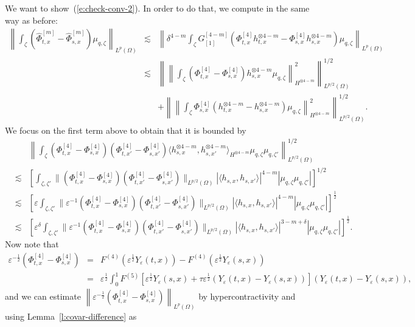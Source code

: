 We want to show~(\ref{e:check-conv-2}). In order to do that, we compute in the
same way as before:
\begin{eqnarray*}
  \left\| \int_{\zeta} (\hat{\Phi}^{[m]}_{t, x} - \hat{\Phi}^{[m]}_{s, x})
  \mu_{q, \zeta} \right\|_{L^p (\Omega)} & \lesssim & \left\| \delta^{4 - m}
  \int_{\zeta} G^{[4 - m]}_{[1]} (\Phi^{[4]}_{t, x} h^{\otimes 4 - m}_{t, x} -
  \Phi^{[4]}_{s, x} h_{s, x}^{\otimes 4 - m}) \mu_{q, \zeta} \right\|_{L^p
  (\Omega)}\\
  & \lesssim & \left\| \left\| \int_{\zeta} (\Phi^{[4]}_{t, x} -
  \Phi^{[4]}_{s, x}) h_{s, x}^{\otimes 4 - m} \mu_{q, \zeta}
  \right\|^2_{H^{\otimes 4 - m}} \right\|_{L^{p / 2} (\Omega)}^{1 / 2}\\
  &  & + \left\| \left\| \int_{\zeta} \Phi^{[4]}_{s, x} (h_{t, x}^{\otimes 4
  - m} - h_{s, x}^{\otimes 4 - m}) \mu_{q, \zeta} \right\|^2_{H^{\otimes 4 -
  m}} \right\|_{L^{p / 2} (\Omega)}^{1 / 2} .
\end{eqnarray*}
We focus on the first term above to obtain that it is bounded by
\begin{eqnarray*}
  &  & \left\| \int_{\zeta} (\Phi^{[4]}_{t, x} - \Phi^{[4]}_{s, x})
  (\Phi^{[4]}_{t, x'} - \Phi^{[4]}_{s, x'}) \langle h_{s, x}^{\otimes 4 - m},
  h_{s, x'}^{\otimes 4 - m} \rangle_{H^{\otimes 4 - m}} \mu_{q, \zeta} \mu_{q,
  \zeta'}  \right\|_{L^{p / 2} (\Omega)}^{1 / 2}\\
  & \lesssim & \left[ \int_{\zeta, \zeta'} \| (\Phi^{[4]}_{t, x} -
  \Phi^{[4]}_{s, x}) (\Phi^{[4]}_{t, x'} - \Phi^{[4]}_{s, x'}) \|_{L^{p / 2}
  (\Omega)}  | \langle h_{s, x}, h_{s, x'} \rangle |^{4 - m}  | \mu_{q, \zeta}
  \mu_{q, \zeta'} | \right]^{1 / 2}\\
  & \lesssim & \left[ \varepsilon \int_{\zeta, \zeta'} \| \varepsilon^{- 1}
  (\Phi^{[4]}_{t, x} - \Phi^{[4]}_{s, x}) (\Phi^{[4]}_{t, x'} - \Phi^{[4]}_{s,
  x'}) \|_{L^{p / 2} (\Omega)} | \langle h_{s, x}, h_{s, x'} \rangle |^{4 - m}
  | \mu_{q, \zeta} \mu_{q, \zeta'} | \right]^{\frac{1}{2}}\\
  & \lesssim & \left[ \varepsilon^{\delta} \int_{\zeta, \zeta'} \|
  \varepsilon^{- 1} (\Phi^{[4]}_{t, x} - \Phi^{[4]}_{s, x}) (\Phi^{[4]}_{t,
  x'} - \Phi^{[4]}_{s, x'}) \|_{L^{p / 2} (\Omega)} | \langle h_{s, x}, h_{s,
  x'} \rangle |^{3 - m + \delta} | \mu_{q, \zeta} \mu_{q, \zeta'} |
  \right]^{\frac{1}{2}} .
\end{eqnarray*}
Now note that
\begin{eqnarray*}
  \varepsilon^{- \frac{1}{2}} (\Phi^{[4]}_{t, x} - \Phi^{[4]}_{s, x}) & = &
  F^{(4)} (\varepsilon^{\frac{1}{2}} Y_{\varepsilon} (t, x)) - F^{(4)}
  (\varepsilon^{\frac{1}{2}} Y_{\varepsilon} (s, x))\\
  & = & \varepsilon^{\frac{1}{2}} \int_0^1 F^{(5)} [\varepsilon^{\frac{1}{2}}
  Y_{\varepsilon} (s, x) + \tau \varepsilon^{\frac{1}{2}} (Y_{\varepsilon} (t,
  x) - Y_{\varepsilon} (s, x))]  (Y_{\varepsilon} (t, x) - Y_{\varepsilon} (s,
  x)),
\end{eqnarray*}
and we can estimate $\left\| \varepsilon^{- \frac{1}{2}} (\Phi^{[4]}_{t, x} -
\Phi^{[4]}_{s, x}) \right\|_{L^p (\Omega)}$ by hypercontractivity and using
Lemma~\ref{l:covar-difference} as


